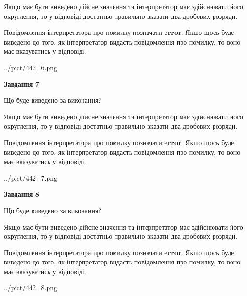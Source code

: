 \documentclass[12pt, ukrainian]{article}
\begin{document}
{\begin {Large}
Якщо має бути виведено дійсне значення та інтерпретатор має здійснювати його округлення, 
то у відповіді достатньо правильно вказати два дробових розряди.

Повідомлення інтерпретатора про помилку позначати \textbf{error}.
Якщо щось буде виведено до того, як інтерпретатор видасть повідомлення про помилку, 
то воно має вказуватись у відповіді. \par

\begin{center}
	{../pict/442_6.png}
\end{center}
\newpage

{\begin {center}\textbf{Завдання 7}\end {center}}\par
Що буде виведено за виконання? \par

Якщо має бути виведено дійсне значення та інтерпретатор має здійснювати його округлення, 
то у відповіді достатньо правильно вказати два дробових розряди.

Повідомлення інтерпретатора про помилку позначати \textbf{error}.
Якщо щось буде виведено до того, як інтерпретатор видасть повідомлення про помилку, 
то воно має вказуватись у відповіді. \par

\begin{center}
	{../pict/442_7.png}
\end{center}
\newpage

{\begin {center}\textbf{Завдання 8}\end {center}}\par
Що буде виведено за виконання? \par

Якщо має бути виведено дійсне значення та інтерпретатор має здійснювати його округлення, 
то у відповіді достатньо правильно вказати два дробових розряди.

Повідомлення інтерпретатора про помилку позначати \textbf{error}.
Якщо щось буде виведено до того, як інтерпретатор видасть повідомлення про помилку, 
то воно має вказуватись у відповіді. \par

\begin{center}
	{../pict/442_8.png}
\end{center}
\newpage


\end{Large}}
\end{document}
